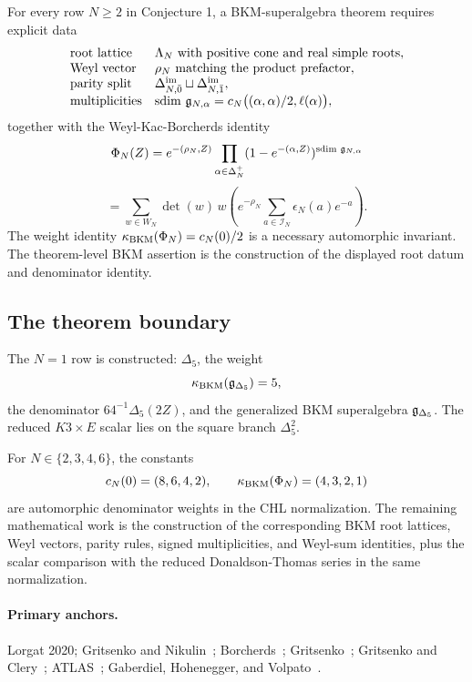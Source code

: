 For every row \(N\geq2\) in Conjecture 1, a BKM-superalgebra theorem
requires explicit data
\[
\begin{array}{ll}
\text{root lattice} & \Lambda_N\ \text{with positive cone and real simple roots},\\
\text{Weyl vector} & \rho_N\ \text{matching the product prefactor},\\
\text{parity split} &
  \Delta^{\mathrm{im}}_{N,\bar0}\sqcup\Delta^{\mathrm{im}}_{N,\bar1},\\
\text{multiplicities} &
  \operatorname{sdim}\,\mathfrak{g}_{N,\alpha}
  =c_N\bigl((\alpha,\alpha)/2,\ell(\alpha)\bigr),
\end{array}
\]
together with the Weyl-Kac-Borcherds identity
\[
  \Phi_N(Z)=e^{-(\rho_N,Z)}
  \prod_{\alpha\in\Delta_N^+}
  (1-e^{-(\alpha,Z)})^{\operatorname{sdim}\,\mathfrak{g}_{N,\alpha}}
\]
\[
  =
  \sum_{w\in W_N}\det(w)\,
  w\!\left(e^{-\rho_N}
  \sum_{a\in\mathcal I_N}\epsilon_N(a)e^{-a}\right).
\]
The weight identity \(\kappa_{\mathrm{BKM}}(\Phi_N)=c_N(0)/2\) is a necessary
automorphic invariant. The theorem-level BKM assertion is the
construction of the displayed root datum and denominator identity.

\subsection{The theorem boundary}
\label{subsec:lorgat-conjecture-one-theorem-boundary-result}

The \(N=1\) row is constructed: \(\Delta_5\), the weight
\[
  \kappa_{\mathrm{BKM}}(\mathfrak{g}_{\Delta_5})=5,
\]
the denominator \(64^{-1}\Delta_5(2Z)\), and the generalized BKM
superalgebra \(\mathfrak{g}_{\Delta_5}\). The reduced \(K3\times E\) scalar lies on the
square branch \(\Delta_5^2\).

For \(N\in\{2,3,4,6\}\), the constants
\[
  c_N(0)=(8,6,4,2),
  \qquad
  \kappa_{\mathrm{BKM}}(\Phi_N)=(4,3,2,1)
\]
are automorphic denominator weights in the CHL normalization. The
remaining mathematical work is the construction of the corresponding
BKM root lattices, Weyl vectors, parity rules, signed multiplicities,
and Weyl-sum identities, plus the scalar comparison with the reduced
Donaldson-Thomas series in the same normalization.

\paragraph{Primary anchors.}
Lorgat 2020;
Gritsenko and Nikulin~\cite{GritsenkoNikulin1995,GritsenkoNikulin1998};
Borcherds~\cite{Borcherds1995,Borcherds1998};
Gritsenko~\cite{Gritsenko1999};
Gritsenko and Clery~\cite{GritsenkoClery2013};
ATLAS~\cite{ConwayCurtisNortonParkerWilson1985};
Gaberdiel, Hohenegger, and Volpato~\cite{GaberdielHoheneggerVolpato2010}.
